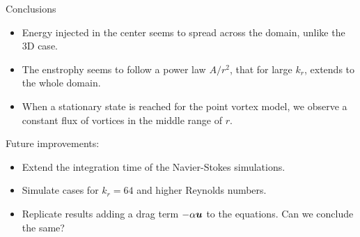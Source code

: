 \documentclass{beamer} %
\begin{document}
\begin{frame}{Conclusions}
	\begin{itemize}
		\item Energy injected in the center seems to spread across the domain, unlike the 3D case.
		\item The enstrophy seems to follow a power law $A/r^2$, that for large $k_r$, extends to the whole domain.
		\item When a stationary state is reached for the point vortex model, we observe a constant flux of vortices in the middle range of $r$.
	\end{itemize}

	Future improvements:
	\begin{itemize}
		\item Extend the integration time of the Navier-Stokes simulations.
		\item Simulate cases for $k_r= 64$ and higher Reynolds numbers.
		\item Replicate results adding a drag term $-\alpha \boldsymbol{u}$ to the equations. Can we conclude the same?
	\end{itemize}
\end{frame}

\end{document}
